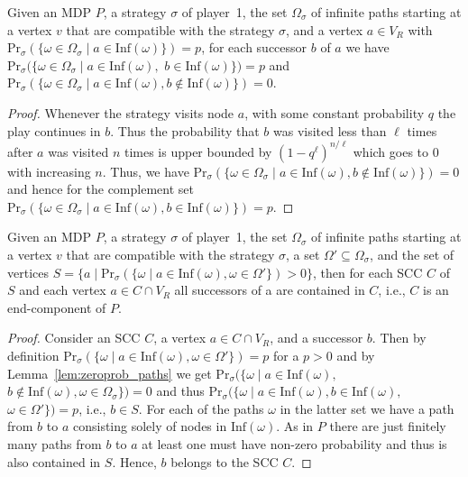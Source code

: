 \documentclass[11pt,letterpaper]{article}
\newcommand{\Inf}{\mathrm{Inf}}
\newcommand{\pat}{\omega\xspace}
\newcommand{\Path}{\Omega\xspace}
\newcommand{\str}{\sigma\xspace}
\newcommand{\mdp}{P\xspace}
\begin{document}
\begin{lemma}\label{lem:zeroprob_paths}
  Given an MDP $\mdp$, a strategy $\str$ of player~1,
  the set $\Path_\str$ of infinite paths starting at a vertex $v$ that are compatible with the strategy $\str$, and
  a vertex $a \in V_R$ with $\mathrm{Pr}_\sigma\left(\{\pat \in \Path_\str \mid a \in \Inf(\pat) \}\right)=p$,
  for each successor $b$ of $a$ we have  
  $\mathrm{Pr}_\sigma(\{\pat \in \Path_\str \mid a \in \Inf(\pat),$ $b \in \Inf(\pat) \})=p$ and
  $\mathrm{Pr}_\sigma\left(\{\pat \in \Path_\str \mid a \in \Inf(\pat), b \notin \Inf(\pat) \}\right)=0$.
\end{lemma}
\begin{proof}
  Whenever the strategy visits node $a$, with some constant probability $q$ the play continues in $b$.
  Thus the probability that $b$ was visited less than $\ell$ times after $a$ was visited $n$ times
  is upper bounded by $(1-q^\ell)^{n/\ell}$ which goes to $0$ with increasing $n$.
  Thus, we have $\mathrm{Pr}_\sigma\left(\{\pat \in \Path_\str \mid a \in \Inf(\pat), b \notin \Inf(\pat) \}\right)=0$
  and hence for the complement set $\mathrm{Pr}_\sigma(\{\pat \in \Path_\str \mid a \in \Inf(\pat), b \in \Inf(\pat) \})=p$.
\end{proof}

\begin{lemma}\label{lem:random_closure} 
  Given an MDP $\mdp$, a strategy $\str$ of player~1,
  the set $\Path_\str$ of infinite paths starting at a vertex $v$ that are compatible with the strategy $\str$, 
  a set $\Path' \subseteq \Path_\str$, and the set of vertices 
  $S=\{ a \mid \mathrm{Pr}_\sigma\left( \{ \pat \mid a \in \Inf(\pat), \pat \in \Path' \} \right) > 0\}$, then
  for each SCC $C$ of $S$ and each vertex $a \in C \cap V_R$ all successors of a are contained in $C$, i.e., $C$ is an end-component of $\mdp$.
\end{lemma}
\begin{proof}
 Consider an SCC $C$, a vertex $a \in C \cap V_R$, and a successor $b$.
 Then by definition $\mathrm{Pr}_\sigma\left( \{ \pat \mid a \in \Inf(\pat), \pat \in \Path'\} \right) = p$ 
 for a $p>0$ and by Lemma~\ref{lem:zeroprob_paths} 
 we get $\mathrm{Pr}_\sigma( \{ \pat \mid a \in \Inf(\pat),$ $b \notin \Inf(\pat), \pat \in \Path_\str \})=0$
 and thus $\mathrm{Pr}_\sigma ( \{ \pat \mid a \in \Inf(\pat), b \in \Inf(\pat),$ $\pat \in \Path'\}) = p$,
 i.e., $b \in S$.
 For each of the paths $\pat$ in the latter set we have a path from $b$ to $a$ consisting solely of nodes in $\Inf(\pat)$.
 As in $\mdp$ there are just finitely many paths from $b$ to $a$ at least one must have non-zero probability 
 and thus is also contained in $S$.  Hence, $b$ belongs to the SCC $C$.
\end{proof}
\end{document}
